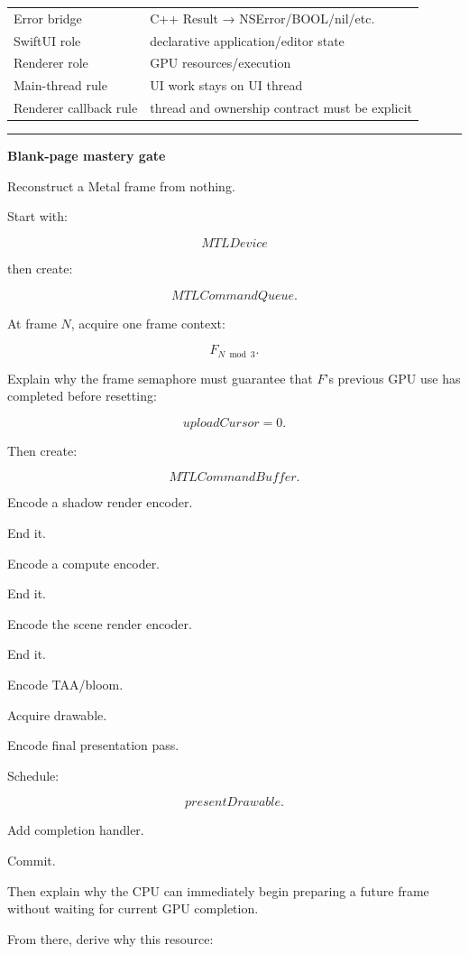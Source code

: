 {\begin{longtable}[]{@{}
  >{\raggedright\arraybackslash}p{}
  >{\raggedright\arraybackslash}p{}@{}}
Error bridge & C++ Result → NSError/BOOL/nil/etc. \\
SwiftUI role & declarative application/editor state \\
Renderer role & GPU resources/execution \\
Main-thread rule & UI work stays on UI thread \\
Renderer callback rule & thread and ownership contract must be explicit \\
\end{longtable}
}

\begin{center}\rule{0.5\linewidth}{0.5pt}\end{center}

\textbf{Blank-page mastery gate}

Reconstruct a Metal frame from nothing.

Start with:

\[
MTLDevice
\]

then create:

\[
MTLCommandQueue.
\]

At frame \(N\), acquire one frame context:

\[
F_{N\bmod3}.
\]

Explain why the frame semaphore must guarantee that \(F\)'s previous GPU use has completed before resetting:

\[
uploadCursor=0.
\]

Then create:

\[
MTLCommandBuffer.
\]

Encode a shadow render encoder.

End it.

Encode a compute encoder.

End it.

Encode the scene render encoder.

End it.

Encode TAA/bloom.

Acquire drawable.

Encode final presentation pass.

Schedule:

\[
presentDrawable.
\]

Add completion handler.

Commit.

Then explain why the CPU can immediately begin preparing a future frame without waiting for current GPU completion.

From there, derive why this resource:

